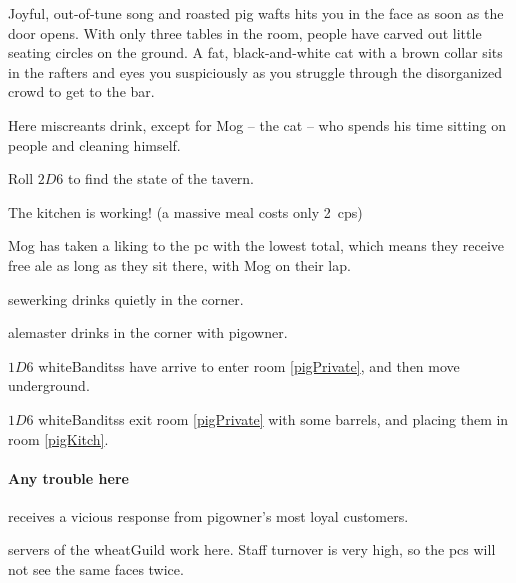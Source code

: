 \begin{boxtext}

  Joyful, out-of-tune song and roasted pig wafts hits you in the face as soon as the door opens.
  With only three tables in the room, people have carved out little seating circles on the ground.
  A fat, black-and-white cat with a brown collar sits in the rafters and eyes you suspiciously as you struggle through the disorganized crowd to get to the bar.

\end{boxtext}


Here miscreants drink, except for Mog -- the cat -- who spends his time sitting on people and cleaning himself.

Roll $2D6$ to find the state of the tavern.

\begin{dlist}
  \item
  The kitchen is working!
  (a massive meal costs only 2~\glspl{cp})
  \item
  Mog has taken a liking to the \gls{pc} with the lowest  total, which means they receive free ale as long as they sit there, with Mog on their lap.
  \item
  \Gls{sewerking} drinks quietly in the corner.
  \item
  \Gls{alemaster} drinks in the corner with \gls{pigowner}.
  \item
  $1D6$ \glspl{whiteBandits} have arrive to enter room \vref{pigPrivate}, and then move underground.
  \item
  $1D6$ \glspl{whiteBandits} exit room \ref{pigPrivate} with some barrels, and placing them in room \vref{pigKitch}.
\end{dlist}

\paragraph{Any trouble here}
receives a vicious response from \gls{pigowner}'s most loyal customers.



\Glspl{server} of the \gls{wheatGuild} work here.
Staff turnover is very high, so the \glspl{pc} will not see the same faces twice.

\pigowner


